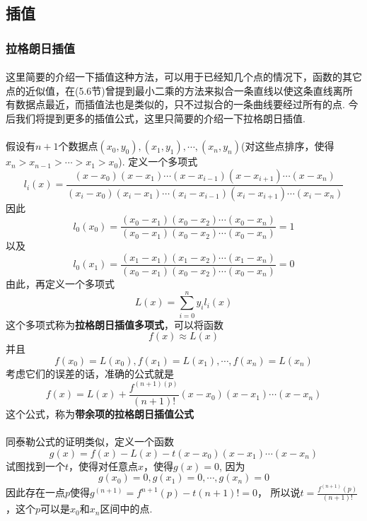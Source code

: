 \subsection{插值}
\subsubsection{拉格朗日插值}
\paragraph{}
这里简要的介绍一下插值这种方法，可以用于已经知几个点的情况下，函数的其它点的近似值，在(5.6节)曾提到最小二乘的方法来拟合一条直线以使这条直线离所有数据点最近，而插值法也是类似的，只不过拟合的一条曲线要经过所有的点. 今后我们将提到更多的插值公式，这里只简要的介绍一下拉格朗日插值.

\paragraph{}
假设有$n+1$个数据点$(x_0, y_0), (x_1, y_1), \cdots, (x_n, y_n)$(对这些点排序，使得$x_n > x_{n-1} > \cdots > x_1 > x_0$). 定义一个多项式
$$
l_i(x) = \frac{(x - x_0) (x - x_1) \cdots (x - x_{i-1}) (x - x_{i+1}) \cdots (x-x_n)}{(x_i - x_0) (x_i - x_1) \cdots (x_i - x_{i-1}) (x_i - x_{i+1}) \cdots (x_i -x_n)}
$$
因此
$$
l_0(x_0) =  \frac{(x_0 - x_1) (x_0 - x_2)  \cdots (x_0-x_n)}{(x_0 - x_1) (x_0 - x_2)\cdots  (x_0 -x_n)} = 1
$$
以及
$$
l_0(x_1) =  \frac{(x_1 - x_1) (x_1 - x_2)  \cdots (x_1-x_n)}{(x_0 - x_1) (x_0 - x_2)\cdots  (x_0 -x_n)} = 0
$$
由此，再定义一个多项式
$$
L(x) = \sum_{i = 0}^n y_i l_i(x)
$$
这个多项式称为\textbf{拉格朗日插值多项式}，可以将函数
$$
f(x) \approx L(x)
$$
并且
$$
f(x_0) = L(x_0), f(x_1) = L(x_1), \cdots, f(x_n) = L(x_n)
$$
考虑它们的误差的话，准确的公式就是
$$
f(x) = L(x) + \frac{f^{(n+1)(p)}}{(n+1)!} (x - x_0)(x - x_1)\cdots (x - x_n)
$$
这个公式，称为\textbf{带余项的拉格朗日插值公式}

\paragraph{}
同泰勒公式的证明类似，定义一个函数
$$
g(x) = f(x) - L(x) - t (x - x_0)(x - x_1)\cdots (x - x_n)
$$
试图找到一个$t$，使得对任意点$x$，使得$g(x) = 0$,  因为
$$
g(x_0) = 0, g(x_1) = 0, \cdots, g(x_n) = 0
$$
因此存在一点$p$使得$g^{(n+1)} = f^{n+1}(p) - t (n+1)! = 0$， 所以说$t = \frac{f^{(n+1)}(p)}{(n+1)!}$ ，这个$p$可以是$x_0$和$x_n$区间中的点.

